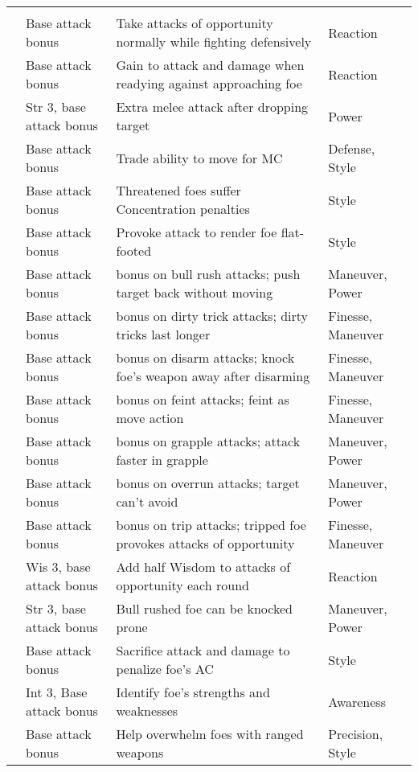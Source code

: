 {\begin{longtabu}{>{\lcol}p{15em} >{\lcol}p{15em} >{\lcol}X >{\lcol}p{10em}}
\midrule
{} &  &  &  \\
 & Base attack bonus  & Take attacks of opportunity normally while fighting defensively & Reaction \\
 & Base attack bonus  & Gain  to attack and damage when readying against approaching foe & Reaction \\
 & Str 3, base attack bonus  & Extra melee attack after dropping target & Power \\
 & Base attack bonus  & Trade ability to move for MC & Defense, Style \\
 & Base attack bonus  & Threatened foes suffer Concentration penalties & Style \\
 & Base attack bonus  & Provoke attack to render foe flat-footed & Style \\
 & Base attack bonus  &  bonus on bull rush attacks; push target back without moving & Maneuver, Power \\
 & Base attack bonus  &  bonus on dirty trick attacks; dirty tricks last longer & Finesse, Maneuver \\
 & Base attack bonus  &  bonus on disarm attacks; knock foe's weapon away after disarming & Finesse, Maneuver \\
 & Base attack bonus  &  bonus on feint attacks; feint as move action & Finesse, Maneuver \\
 & Base attack bonus  &  bonus on grapple attacks; attack faster in grapple & Maneuver, Power \\
 & Base attack bonus  &  bonus on overrun attacks; target can't avoid & Maneuver, Power \\
 & Base attack bonus  &  bonus on trip attacks; tripped foe provokes attacks of opportunity & Finesse, Maneuver \\
 & Wis 3, base attack bonus  & Add half Wisdom to attacks of opportunity each round & Reaction \\
 & Str 3, base attack bonus  & Bull rushed foe can be knocked prone & Maneuver, Power \\
 & Base attack bonus  & Sacrifice attack and damage to penalize foe's AC & Style \\
 & Int 3, Base attack bonus  & Identify foe's strengths and weaknesses & Awareness \\
 & Base attack bonus  & Help overwhelm foes with ranged weapons & Precision, Style \\


\end{longtabu}}
